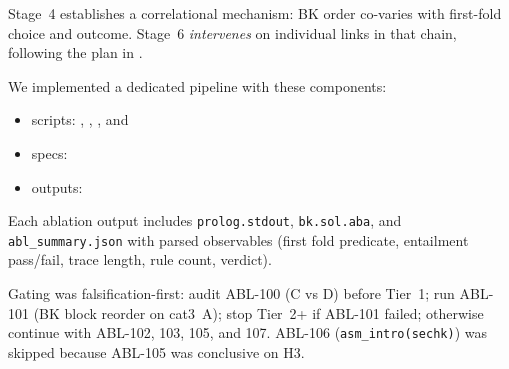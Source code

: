 \documentclass[11pt,a4paper]{article}
\begin{document}
Stage~4 establishes a correlational mechanism: BK order co-varies with first-fold choice and
outcome. Stage~6 \emph{intervenes} on individual links in that chain, following the plan in
.

We implemented a dedicated pipeline with these components:
\begin{itemize}
  \item scripts: , ,
  , and 
  \item specs: 
  \item outputs: 
\end{itemize}
Each ablation output includes \texttt{prolog.stdout}, \texttt{bk.sol.aba}, and
\texttt{abl\_summary.json} with parsed observables (first fold predicate, entailment pass/fail,
trace length, rule count, verdict).

Gating was falsification-first: audit ABL-100 (C vs D) before Tier~1; run ABL-101 (BK block
reorder on cat3~A); stop Tier~2+ if ABL-101 failed; otherwise continue with ABL-102, 103, 105,
and 107. ABL-106 (\texttt{asm\_intro(sechk)}) was skipped because ABL-105 was conclusive on H3.
\end{document}
